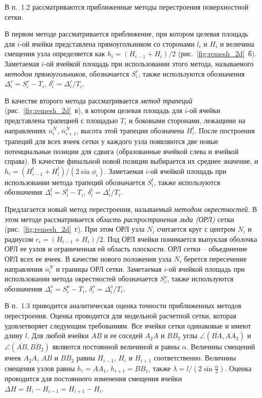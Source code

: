 \documentclass[a4paper,14pt]{extarticle}                     %
\theoremstyle{plain}                                         %
\begin{document}

В п.~1.2 рассматриваются приближенные методы перестроения поверхностной сетки.

В первом методе рассматривается приближение, при котором целевая площадь для $i$-ой ячейки представлена прямоугольником со сторонами $l_i$ и $H_i$ и величина смещения узла определяется как $h_i = (H_{i - 1} + H_i)/2$ (рис.~\ref{fig:remesh_2d}~б).
Заметаемая $i$-ой ячейкой площадь при использовании этого метода, называемого \textit{методом прямоугольников}, обозначается $S_i^r$, также используются обозначения $\Delta_i^r = S_i^r - T_i$, $\delta_i^r = \Delta_i^r / T_i$.

В качестве второго метода рассматривается \textit{метод трапеций} (рис.~\ref{fig:remesh_2d}~в), в котором целевая площадь для $i$-ой ячейки представлена трапецией с площадью $T_i$ и боковыми сторонами, лежащими на направлениях $\overline{n}_i^N$, $\overline{n}_{i + 1}^N$, высота этой трапеции обозначена $H_i^t$.
После построения трапеций для всех ячеек сетки у каждого узла появляются две новые потенциальные позиции для сдвига (образованные ячейкой слева и ячейкой справа).
В качестве финальной новой позиции выбирается их среднее значение, и $h_i = (H_{i - 1}^t + H_i^t) / (2 \sin \phi_i)$.
Заметаемая $i$-ой ячейкой площадь при использовании метода трапеций обозначается $S_i^t$, также используются обозначения $\Delta_i^t = S_i^t - T_i$, $\delta_i^t = \Delta_i^t / T_i$.

Предлагается новый метод перестроения, называемый \textit{методом окрестностей}.
В этом методе рассматривается \textit{область распространения льда (ОРЛ)} сетки (рис.~\ref{fig:remesh_2d}~г).
При этом ОРЛ узла $N_i$ считается круг с центром $N_i$ и радиусом $r_i = (H_{i - 1} + H_i)/2$.
Под ОРЛ ячейки понимается выпуклая оболочка ОРЛ ее узлов и ограниченная ей область плоскости.
ОРЛ сетки -- объединение ОРЛ всех ее ячеек.
В качестве нового положения узла $N_i$ берется пересечение направления $\overline{n}_i^N$ и границы ОРЛ сетки.
Заметаемая $i$-ой ячейкой площадь при использовании метода окрестностей обозначается $S_i^o$, также используются обозначения $\Delta_i^o = S_i^o - T_i$, $\delta_i^o = \Delta_i^o / T_i$.


В п.~1.3 приводится аналитическая оценка точности приближенных методов перестроения.
Оценка проводится для модельной расчетной сетки, которая удовлетворяет следующим требованиям.
Все ячейки сетки одинаковые и имеют длину $l$.
Для любой ячейки $AB$ и ее соседей $A_2A$ и $BB_2$ углы $\angle (\overline{BA}, \overline{AA_2})$ и $\angle (\overline{AB}, \overline{BB_2})$ являются постоянной величиной и равны $\alpha$.
Величины смещений ячеек $A_2A$, $AB$ и $BB_2$ равны $H_{i - 1}$, $H_i$ и $H_{i + 1}$ соответственно.
Величины смещения узлов равны $h_i = AA_1$, $h_{i + 1} = BB_1$, также $\lambda = l / (2 \sin \frac{\alpha}{2})$.
Оценка проводится для постоянного изменения смещения ячейки $\Delta H = H_i - H_{i - 1} = H_{i + 1} - H_i$.
\end{document}
